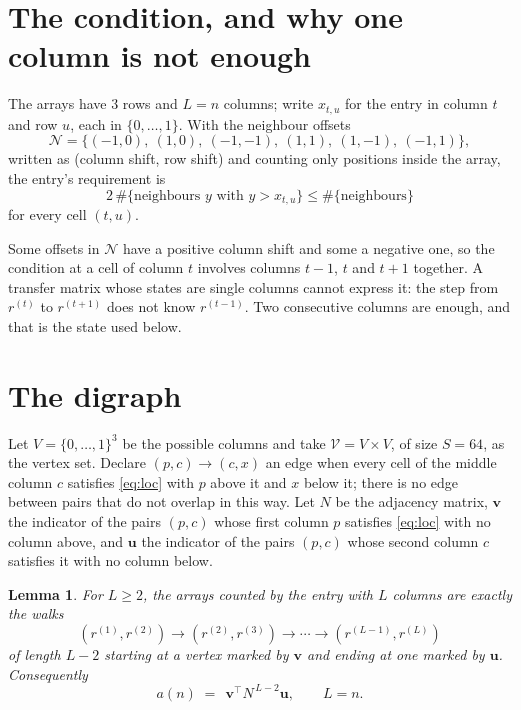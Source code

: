\documentclass[11pt,a4paper]{article}
\theoremstyle{plain}
\newtheorem{lemma}[theorem]{Lemma}
\theoremstyle{definition}
\begin{document}
\section{The condition, and why one column is not enough}

The arrays have $3$ rows and $L=n$ columns; write $x_{t,u}$ for the entry in
column $t$ and row $u$, each in $\{0,\dots,1\}$. With the neighbour offsets
\[
\mathcal N=\{(-1,0),\ (1,0),\ (-1,-1),\ (1,1),\ (1,-1),\ (-1,1)\},
\]
written as (column shift, row shift) and counting only positions inside the array, the
entry's requirement is
\begin{equation}\label{eq:loc}
2\,\#\{\text{neighbours }y\text{ with }y>x_{t,u}\}\le\#\{\text{neighbours}\}
\end{equation}
for every cell $(t,u)$.

Some offsets in $\mathcal N$ have a positive column shift and some a negative one, so the
condition at a cell of column $t$ involves columns $t-1$, $t$ and $t+1$ together. A transfer
matrix whose states are single columns cannot express it: the step from $r^{(t)}$ to
$r^{(t+1)}$ does not know $r^{(t-1)}$. Two consecutive columns are enough, and that is
the state used below.

\section{The digraph}

Let $V=\{0,\dots,1\}^{3}$ be the possible columns and take
$\mathcal V=V\times V$, of size $S=64$, as the vertex set. Declare $(p,c)\to(c,x)$ an edge
when every cell of the middle column $c$ satisfies \eqref{eq:loc} with $p$ above it and $x$
below it; there is no edge between pairs that do not overlap in this way. Let $N$ be the
adjacency matrix, $\mathbf{v}$ the indicator of the pairs $(p,c)$ whose first column $p$
satisfies \eqref{eq:loc} with no column above, and $\mathbf{u}$ the indicator of
the pairs $(p,c)$ whose second column $c$ satisfies it with no column below.

\begin{lemma}\label{lem:walk}
For $L\ge2$, the arrays counted by the entry with $L$ columns are exactly the walks
\[
(r^{(1)},r^{(2)})\to(r^{(2)},r^{(3)})\to\cdots\to(r^{(L-1)},r^{(L)})
\]
of length $L-2$ starting at a vertex marked by $\mathbf{v}$ and ending at one marked by
$\mathbf{u}$. Consequently
\[
a(n)\;=\;\,\mathbf{v}^{\!\top}N^{\,L-2}\mathbf{u},\qquad L=n .
\]
\end{lemma}
\end{document}
